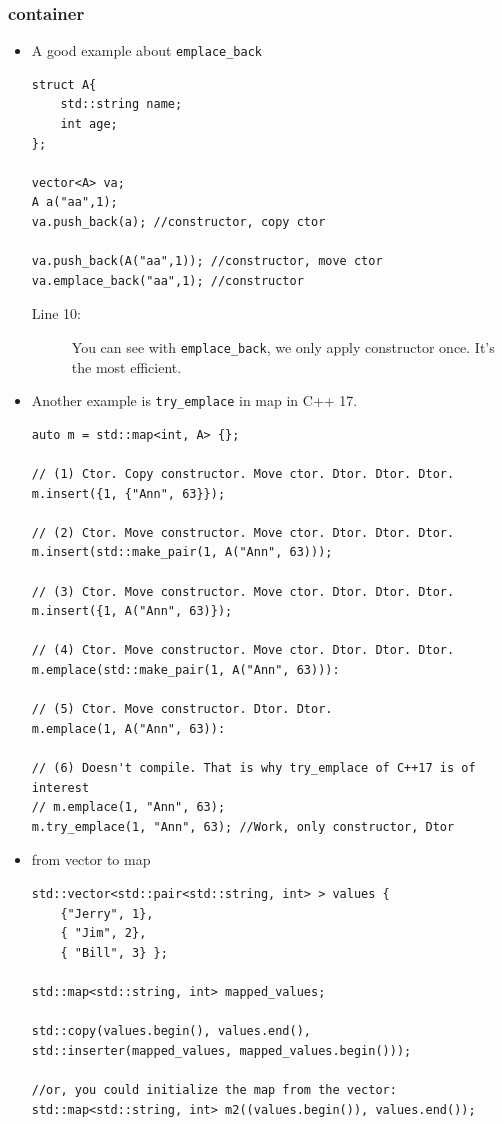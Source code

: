 \documentclass[a4paper,11pt,twoside]{book}
\begin{document}
\subsubsection{container}
\begin{itemize}
\item A good example about \texttt{emplace\_back}
\begin{lstlisting}
struct A{
	std::string name;
	int age;
};

vector<A> va;
A a("aa",1);
va.push_back(a); //constructor, copy ctor

va.push_back(A("aa",1)); //constructor, move ctor
va.emplace_back("aa",1); //constructor 
\end{lstlisting}
\begin{description}
\item[Line 10: ] You can see with \texttt{emplace\_back}, we only apply constructor once. It's the most efficient.
\end{description}

\item Another example is \texttt{try\_emplace} in map in C++ 17.

\begin{lstlisting}
auto m = std::map<int, A> {};
 
// (1) Ctor. Copy constructor. Move ctor. Dtor. Dtor. Dtor.
m.insert({1, {"Ann", 63}});
 
// (2) Ctor. Move constructor. Move ctor. Dtor. Dtor. Dtor.
m.insert(std::make_pair(1, A("Ann", 63)));
 
// (3) Ctor. Move constructor. Move ctor. Dtor. Dtor. Dtor.
m.insert({1, A("Ann", 63)});
 
// (4) Ctor. Move constructor. Move ctor. Dtor. Dtor. Dtor.
m.emplace(std::make_pair(1, A("Ann", 63))):
 
// (5) Ctor. Move constructor. Dtor. Dtor.
m.emplace(1, A("Ann", 63)):
 
// (6) Doesn't compile. That is why try_emplace of C++17 is of interest
// m.emplace(1, "Ann", 63);
m.try_emplace(1, "Ann", 63); //Work, only constructor, Dtor
\end{lstlisting}

\item from vector to map

\begin{lstlisting}
std::vector<std::pair<std::string, int> > values {   
	{"Jerry", 1},
	{ "Jim", 2},
	{ "Bill", 3} };

std::map<std::string, int> mapped_values;

std::copy(values.begin(), values.end(), 
std::inserter(mapped_values, mapped_values.begin()));

//or, you could initialize the map from the vector:
std::map<std::string, int> m2((values.begin()), values.end());
\end{lstlisting}
\end{itemize}
\end{document}
